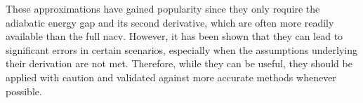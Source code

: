 These approximations have gained popularity since they only require the adiabatic energy gap and its second derivative, which are often more readily available than the full \acrshort{nacv}. However, it has been shown that they can lead to significant errors in certain scenarios, especially when the assumptions underlying their derivation are not met. Therefore, while they can be useful, they should be applied with caution and validated against more accurate methods whenever possible.\supercite{10.1021/acs.jctc.5c01176}

